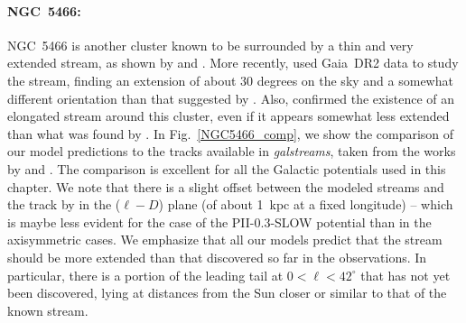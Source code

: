             \paragraph{NGC~5466: } NGC~5466 is another cluster known to be surrounded by a thin and very extended stream, as shown by \citet{2006ApJ...639L..17G} and \citet{2006ApJ...637L..29B}.  More recently,  \citet{2021MNRAS.507.1923J} used Gaia~DR2 data to study the stream, finding an extension of about 30 degrees on the sky and a somewhat different orientation than that suggested by \citet{2006ApJ...639L..17G}.  Also, \citet{2021ApJ...914..123I} confirmed the existence of an elongated stream around this cluster, even if it appears somewhat less extended than what was found by \citet{2006ApJ...639L..17G}. In Fig.~\ref{NGC5466_comp}, we show the comparison of our model predictions to the tracks available in \textit{galstreams}, taken from the works by \citet{2006ApJ...639L..17G}  and \citet{2021ApJ...914..123I}. The comparison is excellent for all the Galactic potentials used in this chapter. We note that there is a slight offset between the modeled streams and the track by \citet{2021ApJ...914..123I}  in the ($\ell-D$) plane (of about 1~kpc at a fixed longitude) --  which is maybe less evident for the case of the PII-0.3-SLOW potential than in the axisymmetric cases.  We emphasize that all our models predict that the stream should be more extended than that discovered so far in the observations. In particular, there is a portion of the leading tail at $0 < \ell < 42^\circ$ that has not yet been discovered, lying at distances from the Sun closer or similar to that of the known stream.
            
